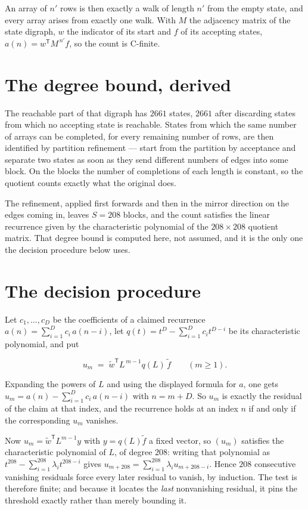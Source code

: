 \documentclass[11pt]{article}
\theoremstyle{definition}
\begin{document}
An array of $n'$ rows is then exactly a walk of length $n'$ from the empty state, and every array arises from exactly one walk. With $M$ the adjacency matrix of the state digraph, $w$ the indicator of its start and $f$ of its accepting states, $a(n) = w^{\mathsf T}M^{\,n'}f$, so the count is C-finite.

\section{The degree bound, derived}

The reachable part of that digraph has $2661$ states, $2661$ after discarding states from which no accepting state is reachable. States from which the same number of arrays can be completed, for every remaining number of rows, are then identified by partition refinement --- start from the partition by acceptance and separate two states as soon as they send different numbers of edges into some block. On the blocks the number of completions of each length is constant, so the quotient counts exactly what the original does.

The refinement, applied first forwards and then in the mirror direction on the edges coming in, leaves $S = 208$ blocks, and the count satisfies the linear recurrence given by the characteristic polynomial of the $208 \times 208$ quotient matrix. That degree bound is computed here, not assumed, and it is the only one the decision procedure below uses.

\section{The decision procedure}

Let $c_1,\dots,c_D$ be the coefficients of a claimed recurrence $a(n) = \sum_{i=1}^{D} c_i\,a(n-i)$, let $q(t) = t^{D} - \sum_{i=1}^{D} c_i t^{D-i}$ be its characteristic polynomial, and put

\[u_m \;=\; \tilde w^{\mathsf T} L^{\,m-1} q(L)\,\tilde f \qquad (m \ge 1).\]

Expanding the powers of $L$ and using the displayed formula for $a$, one gets $u_m = a(n) - \sum_{i=1}^{D} c_i\,a(n-i)$ with $n = m + D$. So $u_m$ is exactly the residual of the claim at that index, and the recurrence holds at an index $n$ if and only if the corresponding $u_m$ vanishes.

Now $u_m = \tilde w^{\mathsf T} L^{m-1} y$ with $y = q(L)\tilde f$ a fixed vector, so $(u_m)$ satisfies the characteristic polynomial of $L$, of degree $208$: writing that polynomial as $t^{208} - \sum_{i=1}^{208} \lambda_i t^{208-i}$ gives $u_{m+208} = \sum_{i=1}^{208} \lambda_i u_{m+208-i}$. Hence $208$ consecutive vanishing residuals force every later residual to vanish, by induction. The test is therefore finite; and because it locates the {\itshape last} nonvanishing residual, it pins the threshold exactly rather than merely bounding it.
\end{document}

